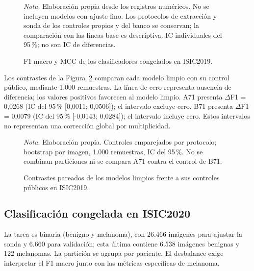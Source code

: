 \begin{figure}[!htbp]
\caption{F1 macro y MCC de los clasificadores congelados en ISIC2019.}
\label{fig:clasificacion-isic2019}
\centering

\par\smallskip
{\singlespacing\fontsize{11}{13}\selectfont\raggedright
\noindent\textit{Nota.} Elaboración propia desde los registros numéricos. No se incluyen modelos con ajuste fino. Los protocolos de extracción y sonda de los controles propios y del banco se conservan; la comparación con las líneas base es descriptiva. IC individuales del 95\,\%; no son IC de diferencias.\par}
\end{figure}
\FloatBarrier
Los contrastes de la Figura~\ref{fig:contrastes-isic2019} comparan cada modelo limpio con su control público, mediante 1.000 remuestras. La línea de cero representa ausencia de diferencia; los valores positivos favorecen al modelo limpio. A71 presenta $\Delta$F1 = 0,0268 (IC del 95\,\% [0,0011; 0,0506]); el intervalo excluye cero. B71 presenta $\Delta$F1 = 0,0079 (IC del 95\,\% [-0,0143; 0,0284]); el intervalo incluye cero. Estos intervalos no representan una corrección global por multiplicidad.

\begin{figure}[!htbp]
\caption{Contrastes pareados de los modelos limpios frente a sus controles públicos en ISIC2019.}
\label{fig:contrastes-isic2019}
\centering

\par\smallskip
{\singlespacing\fontsize{11}{13}\selectfont\raggedright
\noindent\textit{Nota.} Elaboración propia. Controles emparejados por protocolo; bootstrap por imagen, 1.000 remuestras, IC del 95\,\%. No se combinan particiones ni se compara A71 contra el control de B71.\par}
\end{figure}
\FloatBarrier



\subsection{Clasificación congelada en ISIC2020}
\label{sec:clasificacion-isic2020}

La tarea es binaria (benigno y melanoma), con 26.466 imágenes para ajustar la sonda y 6.660 para validación; esta última contiene 6.538 imágenes benignas y 122 melanomas. La partición se agrupa por paciente. El desbalance exige interpretar el F1 macro junto con las métricas específicas de melanoma.

